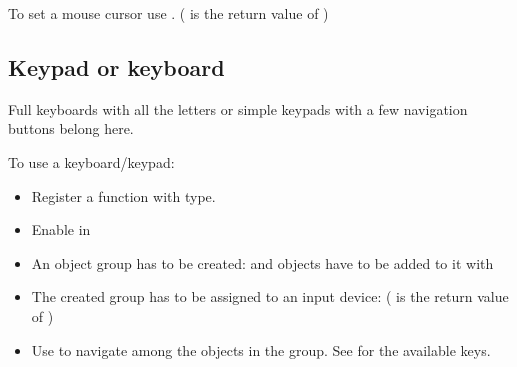 \documentclass[letterpaper,10pt,english]{sphinxmanual}
\begin{document}
To set a mouse cursor use . ( is the return value of )


\subsection{Keypad or keyboard}
\label{\detokenize{porting/indev:keypad-or-keyboard}}
Full keyboards with all the letters or simple keypads with a few navigation buttons belong here.

To use a keyboard/keypad:
\begin{itemize}
\item {} 
Register a  function with  type.

\item {} 
Enable  in 

\item {} 
An object group has to be created:   and objects have to be added to it with 

\item {} 
The created group has to be assigned to an input device:  ( is the return value of )

\item {} 
Use  to navigate among the objects in the group. See  for the available keys.

\end{itemize}
\end{document}

